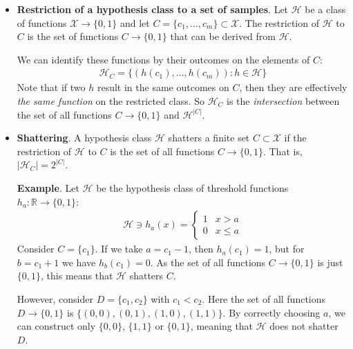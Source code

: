 \documentclass[../template.tex]{subfiles}
\begin{document}
\begin{itemize}
    \item \textbf{Restriction of a hypothesis class to a set of samples}. Let $\mathcal{H}$ be a class of functions $\mathcal{X} \to \{0,1\}$ and let $C = \{c_1, \dots, c_m\} \subset \mathcal{X}$. The restriction of $\mathcal{H}$ to $C$ is the set of functions $C \to \{0,1\}$ that can be derived from $\mathcal{H}$. 
    
    We can identify these functions by their outcomes on the elements of $C$:
    \begin{align*}
        \mathcal{H}_C = \{(h(c_1), \dots, h(c_m)) \colon h \in \mathcal{H}\}
    \end{align*}
    Note that if two $h$ result in the same outcomes on $C$, then they are effectively \textit{the same function} on the restricted class. So $\mathcal{H}_C$ is the \textit{intersection} between the set of all functions $C \to \{0,1\}$ and $\mathcal{H}^{|C|}$. 

    \item \textbf{Shattering}. A hypothesis class $\mathcal{H}$ shatters a finite set $C \subset \mathcal{X}$ if the restriction of $\mathcal{H}$ to $C$ is the set of all functions $C \to \{0,1\}$. That is, $|\mathcal{H}_C| = 2^{|C|}$.
    
    \medskip

    \textbf{Example}. Let $\mathcal{H}$ be the hypothesis class of threshold functions $h_a \colon \mathbb{R} \to \{0,1\}$:
    \begin{align*}
        \mathcal{H}\ni h_a (x) = \begin{cases}
            1 & x > a\\
            0 & x \leq a
        \end{cases}
    \end{align*} 
    Consider $C = \{c_1\}$. If we take $a = c_1 - 1$, then $h_a(c_1) = 1$, but for $b = c_1 +1$ we have $h_b(c_1) = 0$. As the set of all functions $C \to \{0,1\}$ is just $\{0,1\}$, this means that $\mathcal{H}$ shatters $C$.

    However, consider $D = \{c_1,c_2\}$ with $c_1 < c_2$. Here the set of all functions $D \to \{0,1\}$ is $\{(0,0), (0,1), (1,0), (1,1)\}$. By correctly choosing $a$, we can construct only $\{0,0\}$, $\{1,1\}$ or $\{0,1\}$, meaning that $\mathcal{H}$ does not shatter $D$.

\end{itemize}
\end{document}

